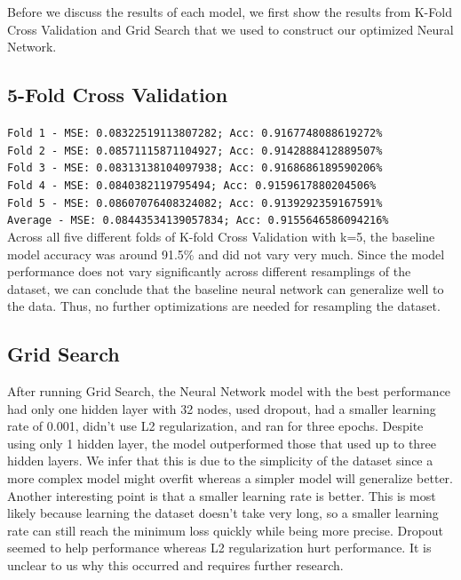 \documentclass[a4paper]{article}
\begin{document}
Before we discuss the results of each model, we first show the results from K-Fold Cross Validation and Grid Search that we used to construct our optimized Neural Network.

\subsection{5-Fold Cross Validation}

\texttt{Fold 1 - MSE: 0.08322519113807282; Acc: 0.9167748088619272\% \\
Fold 2 - MSE: 0.08571115871104927; Acc: 0.9142888412889507\% \\
Fold 3 - MSE: 0.08313138104097938; Acc: 0.9168686189590206\% \\
Fold 4 - MSE: 0.0840382119795494; Acc: 0.9159617880204506\% \\
Fold 5 - MSE: 0.08607076408324082; Acc: 0.9139292359167591\% \\
Average - MSE: 0.08443534139057834; Acc: 0.9155646586094216\%} \\

Across all five different folds of K-fold Cross Validation with k=5, the baseline model accuracy was around 91.5\% and did not vary very much. Since the model performance does not vary significantly across different resamplings of the dataset, we can conclude that the baseline neural network can generalize well to the data. Thus, no further optimizations are needed for resampling the dataset. 

\subsection{Grid Search}

After running Grid Search, the Neural Network model with the best performance had only one hidden layer with 32 nodes, used dropout, had a smaller learning rate of 0.001, didn’t use L2 regularization, and ran for three epochs. Despite using only 1 hidden layer, the model outperformed those that used up to three hidden layers. We infer that this is due to the simplicity of the dataset since a more complex model might overfit whereas a simpler model will generalize better. Another interesting point is that a smaller learning rate is better. This is most likely because learning the dataset doesn’t take very long, so a smaller learning rate can still reach the minimum loss quickly while being more precise. Dropout seemed to help performance whereas L2 regularization hurt performance. It is unclear to us why this occurred and requires further research.
\end{document}
